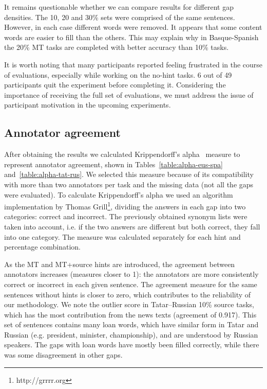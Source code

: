 \documentclass[11pt]{article}
\newcommand{\comment}[1]{\marginpar{\scriptsize\sf \textcolor{blue}{#1}}}
\begin{document}
It remains questionable whether we can compare results for different gap densities. The 10, 20 and 30\% sets were comprised
of the same sentences. However, in each case different words were removed. It appears
that some content words are easier to fill than the others. This may explain why in
Basque-Spanish the 20\% MT tasks are completed with better accuracy than 10\% tasks.

It is worth noting that many participants reported feeling frustrated in
the course of evaluations, especially while working on the no-hint tasks. 6 out of 49
participants quit the experiment before completing it. Considering the importance of receiving the full set of evaluations, we must address the issue of participant motivation in the upcoming experiments.


\subsection{Annotator agreement}
After obtaining the results we calculated Krippendorff's alpha~\citep{krippendorff70} measure to represent annotator agreement, shown in Tables~\ref{table:alpha-eus-spa} and~\ref{table:alpha-tat-rus}. We selected this measure because of its compatibility with more than two annotators per task and the missing data (not all the gaps were evaluated). To calculate Krippendorff's alpha we used an algorithm implementation by Thomas Grill\footnote{http://grrrr.org}, dividing the answers in each gap into two categories: correct and incorrect. The previously obtained synonym lists were taken into account, i.e. if the two answers are different but both correct, they fall into one category. The measure was calculated separately for each hint and percentage combination.

As the MT and MT+source hints are introduced, the agreement between annotators increases (measures closer to 1): the annotators are more consistently correct or incorrect in each given sentence.\comment{EA: I cite Juan Antonio here, because I am not completely sure what alpha shows about our experiment (lack of knowledge on my part)}  The agreement measure for the same sentences without hints is closer to zero, which contributes to the reliability of our methodology. We note the outlier score in Tatar--Russian 10\% source tasks, which has the most contribution from the news texts (agreement of 0.917). This set of sentences contains many loan words, which have similar form in Tatar and Russian (e.g. president, minister, championship), and are understood by Russian speakers. The gaps with loan words have mostly been filled correctly, while there was some disagreement in other gaps.
\end{document}
